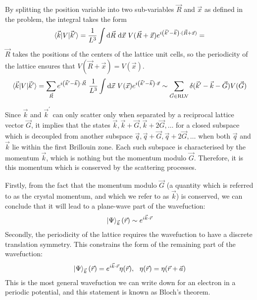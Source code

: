 \documentclass{article}
\begin{document}
By splitting the position variable into two sub-variables \(\vec R\) and \(\vec x\) as defined in the problem, the integral takes the form
\begin{equation}\begin{aligned}
	\braket{\vec k | V | \vec k^\prime} =  \frac{1}{L^3}\int \mathrm{d}\vec R ~ \mathrm{d}\vec x ~V(\vec R + \vec x) e^{i\left( \vec k^\prime - \vec k \right)\cdot (\vec R + \vec x)} = 
\end{aligned}\end{equation}
\(\vec R\) takes the positions of the centers of the lattice unit cells, so the periodicity of the lattice ensures that \(V(\vec R + \vec x) = V(\vec x)\).
\begin{equation}\begin{aligned}
	\braket{\vec k | V | \vec k^\prime} =  \sum_{\vec R} e^{i\left( \vec k^\prime - \vec k \right)\cdot \vec R} ~ \frac{1}{L^3}\int \mathrm{d}\vec x ~V(\vec x) e^{i\left( \vec k^\prime - \vec k \right)\cdot \vec x} \sim \sum_{\vec G\in\text{RLV}}\delta(\vec k^\prime - \vec k - \vec G) V(\vec G)
\end{aligned}\end{equation}

Since \(\vec k\) and \(\vec k^\prime\) can only scatter only when separated by a reciprocal lattice vector \(\vec G\), it implies that the states \(\vec k, \vec k+ \vec G, \vec k + 2\vec G,\ldots\) for a closed subspace which is decoupled from another subspace \(\vec q, \vec q+ \vec G, \vec q + 2\vec G,\ldots\) when both \(\vec q\) and \(\vec k\) lie within the first Brillouin zone. Each such subspace is characterised by the momentum \(\vec k\), which is nothing but the momentum modulo \(\vec G\). Therefore, it is this momentum which is conserved by the scattering processes.

Firstly, from the fact that the momentum modulo \(\vec G\) (a quantity which is referred to as the crystal momentum, and which we refer to as \(\vec k\)) is conserved, we can conclude that it will lead to a plane-wave part of the wavefuction:
\begin{equation}\begin{aligned}
	\ket{\Psi}_{\vec k}(\vec r) \sim e^{i \vec{k}\cdot\vec{r}}
\end{aligned}\end{equation}
Secondly, the periodicity of the lattice requires the wavefuction to have a discrete translation symmetry. This constrains the form of the remaining part of the wavefuction:
\begin{equation}\begin{aligned}
	\ket{\Psi}_{\vec k}(\vec r) = e^{i \vec{k}\cdot\vec{r}} \eta(\vec r), ~ ~ \eta(\vec r) = \eta(\vec r + \vec a)
\end{aligned}\end{equation}
This is the most general wavefuction we can write down for an electron in a periodic potential, and this statement is known as Bloch's theorem.
\end{document}
